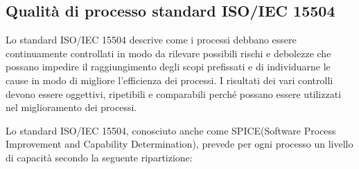 \subsection{Qualità di processo standard ISO/IEC 15504}\label{15504}
Lo standard ISO/IEC 15504 descrive come i processi debbano essere continuamente controllati in modo da rilevare possibili rischi e debolezze che possano impedire il raggiungimento degli scopi prefissati e di individuarne le cause in modo di migliore l'efficienza dei processi. I risultati dei vari controlli devono essere oggettivi, ripetibili e comparabili perché possano essere utilizzati nel miglioramento dei processi.

\noindent Lo standard ISO/IEC 15504, conosciuto anche come SPICE(Software Process Improvement and Capability Determination), prevede per ogni processo un livello di capacità secondo la seguente ripartizione:

